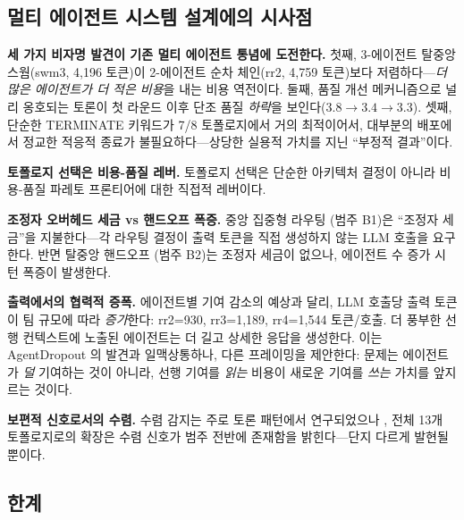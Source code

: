 \documentclass[a4paper,11pt]{article}
\begin{document}
\subsection{멀티 에이전트 시스템 설계에의 시사점}

\textbf{세 가지 비자명 발견이 기존 멀티 에이전트 통념에 도전한다.} 첫째, 3-에이전트 탈중앙 스웜(swm3, 4,196 토큰)이 2-에이전트 순차 체인(rr2, 4,759 토큰)보다 저렴하다---\emph{더 많은 에이전트가 더 적은 비용}을 내는 비용 역전이다. 둘째, 품질 개선 메커니즘으로 널리 옹호되는 토론이 첫 라운드 이후 단조 품질 \emph{하락}을 보인다($3.8 \to 3.4 \to 3.3$). 셋째, 단순한 TERMINATE 키워드가 7/8 토폴로지에서 거의 최적이어서, 대부분의 배포에서 정교한 적응적 종료가 불필요하다---상당한 실용적 가치를 지닌 ``부정적 결과''이다.

\textbf{토폴로지 선택은 비용-품질 레버.} 토폴로지 선택은 단순한 아키텍처 결정이 아니라 비용-품질 파레토 프론티어에 대한 직접적 레버이다.

\textbf{조정자 오버헤드 세금 vs 핸드오프 폭증.} 중앙 집중형 라우팅 (범주 B1)은 ``조정자 세금''을 지불한다---각 라우팅 결정이 출력 토큰을 직접 생성하지 않는 LLM 호출을 요구한다. 반면 탈중앙 핸드오프 (범주 B2)는 조정자 세금이 없으나, 에이전트 수 증가 시 턴 폭증이 발생한다.

\textbf{출력에서의 협력적 증폭.} 에이전트별 기여 감소의 예상과 달리, LLM 호출당 출력 토큰이 팀 규모에 따라 \emph{증가}한다: rr2=930, rr3=1,189, rr4=1,544 토큰/호출. 더 풍부한 선행 컨텍스트에 노출된 에이전트는 더 길고 상세한 응답을 생성한다. 이는 AgentDropout \citep{wang2025agentdropout}의 발견과 일맥상통하나, 다른 프레이밍을 제안한다: 문제는 에이전트가 \emph{덜} 기여하는 것이 아니라, 선행 기여를 \emph{읽는} 비용이 새로운 기여를 \emph{쓰는} 가치를 앞지르는 것이다.

\textbf{보편적 신호로서의 수렴.} 수렴 감지는 주로 토론 패턴에서 연구되었으나 \citep{hu2025when}, 전체 13개 토폴로지로의 확장은 수렴 신호가 범주 전반에 존재함을 밝힌다---단지 다르게 발현될 뿐이다.

\subsection{한계}
\end{document}
